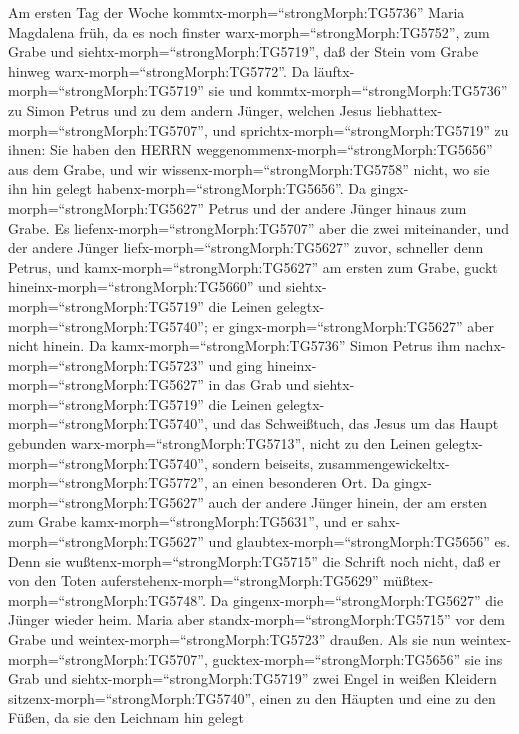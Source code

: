  Am ersten Tag der Woche kommtx-morph=``strongMorph:TG5736''
Maria Magdalena früh, da es noch finster
warx-morph=``strongMorph:TG5752'', zum Grabe und
siehtx-morph=``strongMorph:TG5719'', daß der Stein vom Grabe hinweg
warx-morph=``strongMorph:TG5772''.  Da
läuftx-morph=``strongMorph:TG5719'' sie und
kommtx-morph=``strongMorph:TG5736'' zu Simon Petrus und zu dem andern
Jünger, welchen Jesus liebhattex-morph=``strongMorph:TG5707'', und
sprichtx-morph=``strongMorph:TG5719'' zu ihnen: Sie haben den HERRN
weggenommenx-morph=``strongMorph:TG5656'' aus dem Grabe, und wir
wissenx-morph=``strongMorph:TG5758'' nicht, wo sie ihn hin gelegt
habenx-morph=``strongMorph:TG5656''.  Da
gingx-morph=``strongMorph:TG5627'' Petrus und der andere Jünger hinaus
zum Grabe.  Es liefenx-morph=``strongMorph:TG5707'' aber die
zwei miteinander, und der andere Jünger
liefx-morph=``strongMorph:TG5627'' zuvor, schneller denn Petrus, und
kamx-morph=``strongMorph:TG5627'' am ersten zum Grabe, 
guckt hineinx-morph=``strongMorph:TG5660'' und
siehtx-morph=``strongMorph:TG5719'' die Leinen
gelegtx-morph=``strongMorph:TG5740''; er
gingx-morph=``strongMorph:TG5627'' aber nicht hinein.  Da
kamx-morph=``strongMorph:TG5736'' Simon Petrus ihm
nachx-morph=``strongMorph:TG5723'' und ging
hineinx-morph=``strongMorph:TG5627'' in das Grab und
siehtx-morph=``strongMorph:TG5719'' die Leinen
gelegtx-morph=``strongMorph:TG5740'',  und das Schweißtuch,
das Jesus um das Haupt gebunden warx-morph=``strongMorph:TG5713'', nicht
zu den Leinen gelegtx-morph=``strongMorph:TG5740'', sondern beiseits,
zusammengewickeltx-morph=``strongMorph:TG5772'', an einen besonderen
Ort.  Da gingx-morph=``strongMorph:TG5627'' auch der andere
Jünger hinein, der am ersten zum Grabe
kamx-morph=``strongMorph:TG5631'', und er
sahx-morph=``strongMorph:TG5627'' und
glaubtex-morph=``strongMorph:TG5656'' es.  Denn sie
wußtenx-morph=``strongMorph:TG5715'' die Schrift noch nicht, daß er von
den Toten auferstehenx-morph=``strongMorph:TG5629''
müßtex-morph=``strongMorph:TG5748''.  Da
gingenx-morph=``strongMorph:TG5627'' die Jünger wieder heim.
 Maria aber standx-morph=``strongMorph:TG5715'' vor dem
Grabe und weintex-morph=``strongMorph:TG5723'' draußen. Als sie nun
weintex-morph=``strongMorph:TG5707'',
gucktex-morph=``strongMorph:TG5656'' sie ins Grab  und
siehtx-morph=``strongMorph:TG5719'' zwei Engel in weißen Kleidern
sitzenx-morph=``strongMorph:TG5740'', einen zu den Häupten und eine zu
den Füßen, da sie den Leichnam hin gelegt
